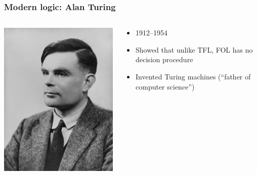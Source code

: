 \begin{frame}
  \frametitle{Modern logic: Alan Turing}

  \begin{columns}
    \begin{column}{.5\textwidth}
      \includegraphics[width=\textwidth]{../assets/turing}
    \end{column}
    \begin{column}{.5\textwidth}
      \begin{itemize}
        \item 1912--1954
        \item Showed that unlike TFL, FOL has no decision procedure
        \item Invented Turing machines (``father of computer science'')
      \end{itemize}
    \end{column}
  \end{columns}
\end{frame}

